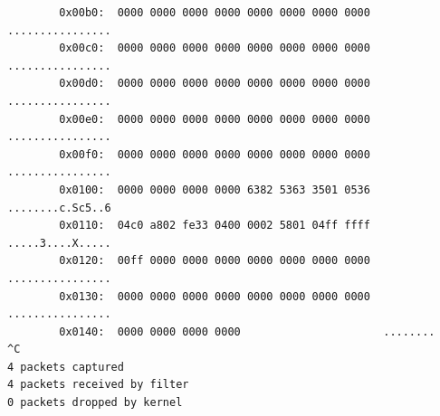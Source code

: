 \documentclass{mwart} %
\begin{document}
\begin{footnotesize}
\begin{verbatim}
        0x00b0:  0000 0000 0000 0000 0000 0000 0000 0000  ................ 
        0x00c0:  0000 0000 0000 0000 0000 0000 0000 0000  ................
        0x00d0:  0000 0000 0000 0000 0000 0000 0000 0000  ................
        0x00e0:  0000 0000 0000 0000 0000 0000 0000 0000  ................
        0x00f0:  0000 0000 0000 0000 0000 0000 0000 0000  ................
        0x0100:  0000 0000 0000 0000 6382 5363 3501 0536  ........c.Sc5..6
        0x0110:  04c0 a802 fe33 0400 0002 5801 04ff ffff  .....3....X.....
        0x0120:  00ff 0000 0000 0000 0000 0000 0000 0000  ................
        0x0130:  0000 0000 0000 0000 0000 0000 0000 0000  ................
        0x0140:  0000 0000 0000 0000                      ........
^C 
4 packets captured
4 packets received by filter
0 packets dropped by kernel
\end{verbatim}
\end{footnotesize}
\end{document}
